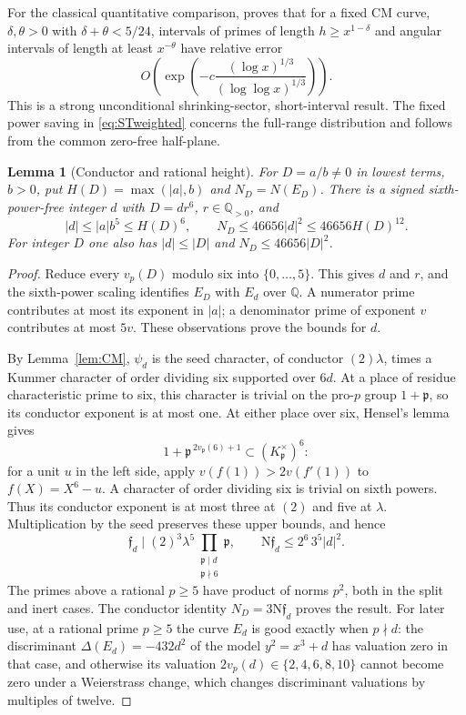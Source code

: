 \documentclass[11pt,a4paper]{article}
\numberwithin{equation}{section}
\newtheorem{lemma}[theorem]{Lemma}
\theoremstyle{definition}
\theoremstyle{remark}
\newcommand{\Q}{\mathbb Q}
\newcommand{\N}{\mathrm N}
\begin{document}
For the classical quantitative comparison, \cite[Theorem 1.1]{PT} proves that for a fixed CM curve, $\delta,\theta>0$ with $\delta+\theta<5/24$, intervals of primes of length $h\ge x^{1-\delta}$ and angular intervals of length at least $x^{-\theta}$ have relative error
\[
 O\left(\exp\left(-c\frac{(\log x)^{1/3}}{(\log\log x)^{1/3}}\right)\right).
\]
This is a strong unconditional shrinking-sector, short-interval result. The fixed power saving in \eqref{eq:STweighted} concerns the full-range distribution and follows from the common zero-free half-plane.


\begin{lemma}[Conductor and rational height]\label{lem:height}
For $D=a/b\ne0$ in lowest terms, $b>0$, put $H(D)=\max(|a|,b)$ and $N_D=N(E_D)$. There is a signed sixth-power-free integer $d$ with $D=dr^6$, $r\in\Q_{>0}$, and
\[
 |d|\le |a|b^5\le H(D)^6,\qquad
 N_D\le46656|d|^2\le46656H(D)^{12}.
\]
For integer $D$ one also has $|d|\le|D|$ and $N_D\le46656|D|^2$.
\end{lemma}
\begin{proof}
Reduce every $v_p(D)$ modulo six into $\{0,\ldots,5\}$. This gives $d$ and $r$, and the sixth-power scaling identifies $E_D$ with $E_d$ over $\Q$. A numerator prime contributes at most its exponent in $|a|$; a denominator prime of exponent $v$ contributes at most $5v$. These observations prove the bounds for $d$.

By Lemma~\ref{lem:CM}, $\psi_d$ is the seed character, of conductor $(2)\lambda$, times a Kummer character of order dividing six supported over $6d$. At a place of residue characteristic prime to six, this character is trivial on the pro-$p$ group $1+\mathfrak p$, so its conductor exponent is at most one. At either place over six, Hensel's lemma gives
\[
 1+\mathfrak p^{\,2v_{\mathfrak p}(6)+1}
 \subset (K_{\mathfrak p}^{\times})^6:
\]
for a unit $u$ in the left side, apply $v(f(1))>2v(f'(1))$ to $f(X)=X^6-u$. A character of order dividing six is trivial on sixth powers. Thus its conductor exponent is at most three at $(2)$ and five at $\lambda$. Multiplication by the seed preserves these upper bounds, and hence
\[
 \mathfrak f_d\mid(2)^3\lambda^5
 \prod_{\substack{\mathfrak p\mid d\\\mathfrak p\nmid6}}\mathfrak p,
 \qquad \N\mathfrak f_d\le2^6\,3^5|d|^2.
\]
The primes above a rational $p\ge5$ have product of norms $p^2$, both in the split and inert cases. The conductor identity $N_D=3\N\mathfrak f_d$ proves the result. For later use, at a rational prime $p\ge5$ the curve $E_d$ is good exactly when $p\nmid d$: the discriminant $\Delta(E_d)=-432d^2$ of the model $y^2=x^3+d$ has valuation zero in that case, and otherwise its valuation $2v_p(d)\in\{2,4,6,8,10\}$ cannot become zero under a Weierstrass change, which changes discriminant valuations by multiples of twelve.
\end{proof}
\end{document}
